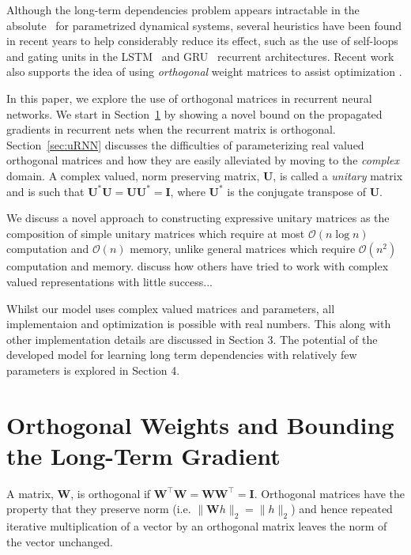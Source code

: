 \documentclass{article} %
\newcommand{\matr}[1]{\mathbf{#1}}
\begin{document}
Although the long-term dependencies problem appears intractable in the absolute~\citep{Yoshua94} for
parametrized dynamical systems, several heuristics have been found in recent years to help considerably
reduce its effect, such as the use of self-loops and gating units in the LSTM~\citep{LSTM}
and GRU~\citep{Cho2014a} recurrent architectures.
Recent work also supports the idea of using \textit{orthogonal} weight matrices to assist optimization  
\citep{Saxe2014} \citep{Quoc2015}.


In this paper, we explore the use of orthogonal matrices in recurrent neural networks.
We start in Section~\ref{sec:ortho} by showing a novel bound on the propagated gradients
in recurrent nets when the recurrent matrix is orthogonal.
Section~\ref{sec:uRNN} discusses the difficulties of parameterizing real valued orthogonal matrices and how
they are easily alleviated by moving to the \textit{complex} domain. 
A complex valued, norm preserving matrix,
$\matr{U}$, is called a \textit{unitary} matrix and is such that 
$\matr{U}^* \matr{U} = \matr{U} \matr{U}^* = \matr{I}$, where $\matr{U}^*$ is the conjugate transpose
of $\matr{U}$.   

We discuss a novel approach to constructing expressive unitary matrices as the composition of simple
unitary matrices which require at most $\mathcal{O}(n \log n)$ computation and $\mathcal{O}(n)$ memory,
unlike general matrices which require $\mathcal{O}(n^2)$ computation and memory. {\color{red} discuss how 
others have tried to work with complex valued representations with little success... }

Whilst our model uses complex valued matrices and parameters, all implementaion and optimization is 
possible with real numbers. This along with other implementation details are discussed in Section 3.
The potential of the developed model for learning long term dependencies with relatively few parameters is
explored in Section 4.

\section{Orthogonal Weights and Bounding the Long-Term Gradient}
\label{sec:ortho}

A matrix, $\matr{W}$, is orthogonal if 
$\matr{W}^\top \matr{W} = \matr{W} \matr{W}^\top = \matr{I}$. 
Orthogonal matrices have the property that they preserve norm (i.e. $\| \matr{W} h \|_2 = \| h \|_2$)
and hence repeated iterative multiplication of a vector by an orthogonal matrix leaves the norm of the 
vector unchanged.
\end{document}
